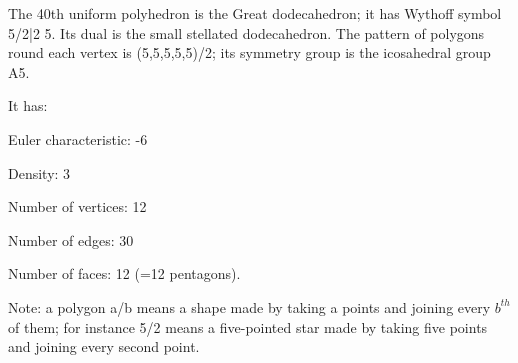The 40th uniform polyhedron is the Great dodecahedron; it has Wythoff symbol 5/2|2 5. Its dual is the small stellated dodecahedron. The pattern of polygons round each vertex is (5,5,5,5,5)/2; its symmetry group is the icosahedral group A5.\par
It has:\par
Euler characteristic: -6\par
Density: 3\par
Number of vertices: 12\par
Number of edges:  30\par
Number of faces: 12 (=12 pentagons).\par
Note: a polygon a/b means a shape made by taking a points and joining every $b^{th}$  of them; for instance 5/2 means a five-pointed star made by taking five points and joining every second point.
